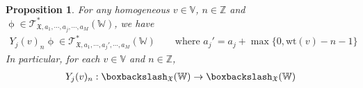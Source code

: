 \documentclass[11pt,b5paper,notitlepage]{article}
\theoremstyle{definition}
\theoremstyle{plain}
\newtheorem{pp}[df]{Proposition}
\newtheorem{lm}[df]{Lemma}
\newcommand{\Vbb}{\mathbb V}
\newcommand{\Wbb}{\mathbb W}
\newcommand{\Zbb}{\mathbb Z}
\newcommand{\wt}{\mathrm{wt}}
\newcommand{\<}{\left\langle}
\renewcommand{\>}{\right\rangle}
\newcommand{\fx}{\mathfrak{X}}
\newcommand{\ST}{\mathscr{T}}
\numberwithin{equation}{subsection}
\begin{document}
\begin{comment}
    \begin{lm}

    \end{lm}
    \begin{proof}
        By Thm. \ref{lb18}-(1), $\wr^2\upphi(u,v,w)$ is independent of the choice of $a_1,\cdots,a_M$ when $u$ is a section near $x_1,\cdots,x_N$. By Assumption \ref{ass1} and analytic continuation, $\wr^2\upphi(u,v,w)$ is independent of the choice of $a_1,\cdots,a_M$ for all $u$ and $v$.
    \end{proof}
\end{comment}


\begin{pp}\label{lb19}
For any homogeneous $v\in \Vbb$, $n\in \Zbb$ and $\upphi\in \ST_{\fx,a_1,\cdots,a_j,\cdots,a_M}^*(\Wbb)$, we have
\begin{align*}
Y_j(v)_n\upphi\in \ST_{\fx,a_1,\cdots,a_j',\cdots,a_M}^*(\Wbb)\qquad\text{where }a_j'=a_j+\max\{0,\wt(v)-n-1\}
\end{align*}
In particular, for each $v\in \Vbb$ and $n\in \Zbb$, 
\begin{gather*}
        Y_j(v)_n:\boxbackslash_\fx(\Wbb)\rightarrow \boxbackslash_\fx(\Wbb)
\end{gather*}
    \end{pp}
\end{document}
